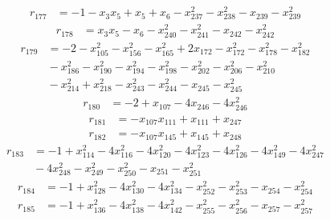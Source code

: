 \[\begin{aligned}
r_{177}&=-1-x_{3}x_{5}+x_{5}+x_{6}-x_{237}^{2}-x_{238}^{2}-x_{239}-x_{239}^{2}
\end{aligned}\]
\[\begin{aligned}
r_{178}&=x_{3}x_{5}-x_{6}-x_{240}^{2}-x_{241}^{2}-x_{242}-x_{242}^{2}
\end{aligned}\]
\[\begin{aligned}
r_{179}&=-2-x_{105}^{2}-x_{156}^{2}-x_{165}^{2}+2x_{172}-x_{172}^{2}-x_{178}^{2}-x_{182}^{2}\\
&{}-x_{186}^{2}-x_{190}^{2}-x_{194}^{2}-x_{198}^{2}-x_{202}^{2}-x_{206}^{2}-x_{210}^{2}\\
&{}-x_{214}^{2}+x_{218}^{2}-x_{243}^{2}-x_{244}^{2}-x_{245}-x_{245}^{2}
\end{aligned}\]
\[\begin{aligned}
r_{180}&=-2+x_{107}-4x_{246}-4x_{246}^{2}
\end{aligned}\]
\[\begin{aligned}
r_{181}&=-x_{107}x_{111}+x_{111}+x_{247}
\end{aligned}\]
\[\begin{aligned}
r_{182}&=-x_{107}x_{145}+x_{145}+x_{248}
\end{aligned}\]
\[\begin{aligned}
r_{183}&=-1+x_{114}^{2}-4x_{116}^{2}-4x_{120}^{2}-4x_{123}^{2}-4x_{126}^{2}-4x_{149}^{2}-4x_{247}^{2}\\
&{}-4x_{248}^{2}-x_{249}^{2}-x_{250}^{2}-x_{251}-x_{251}^{2}
\end{aligned}\]
\[\begin{aligned}
r_{184}&=-1+x_{128}^{2}-4x_{130}^{2}-4x_{134}^{2}-x_{252}^{2}-x_{253}^{2}-x_{254}-x_{254}^{2}
\end{aligned}\]
\[\begin{aligned}
r_{185}&=-1+x_{136}^{2}-4x_{138}^{2}-4x_{142}^{2}-x_{255}^{2}-x_{256}^{2}-x_{257}-x_{257}^{2}
\end{aligned}\]
